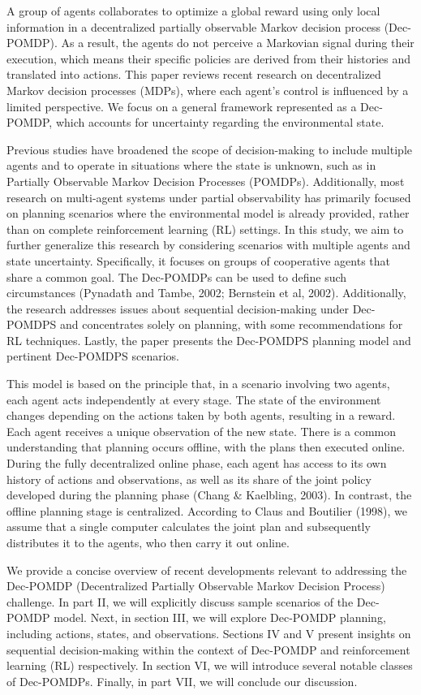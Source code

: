 A group of agents collaborates to optimize a global reward using only local information in a decentralized partially observable Markov decision process (Dec-POMDP). As a result, the agents do not perceive a Markovian signal during their execution, which means their specific policies are derived from their histories and translated into actions. This paper reviews recent research on decentralized Markov decision processes (MDPs), where each agent's control is influenced by a limited perspective. We focus on a general framework represented as a Dec-POMDP, which accounts for uncertainty regarding the environmental state.


Previous studies have broadened the scope of decision-making to include multiple agents and to operate in situations where the state is unknown, such as in Partially Observable Markov Decision Processes (POMDPs). Additionally, most research on multi-agent systems under partial observability has primarily focused on planning scenarios where the environmental model is already provided, rather than on complete reinforcement learning (RL) settings. In this study, we aim to further generalize this research by considering scenarios with multiple agents and state uncertainty. Specifically, it focuses on groups of cooperative agents that share a common goal. The Dec-POMDPs can be used to define such circumstances (Pynadath and Tambe, 2002; Bernstein et al, 2002).  Additionally, the research addresses issues about sequential decision-making under Dec-POMDPS and concentrates solely on planning, with some recommendations for RL techniques. Lastly, the paper presents the Dec-POMDPS planning model and pertinent Dec-POMDPS scenarios.

This model is based on the principle that, in a scenario involving two agents, each agent acts independently at every stage. The state of the environment changes depending on the actions taken by both agents, resulting in a reward. Each agent receives a unique observation of the new state. There is a common understanding that planning occurs offline, with the plans then executed online. During the fully decentralized online phase, each agent has access to its own history of actions and observations, as well as its share of the joint policy developed during the planning phase (Chang & Kaelbling, 2003). In contrast, the offline planning stage is centralized. According to Claus and Boutilier (1998), we assume that a single computer calculates the joint plan and subsequently distributes it to the agents, who then carry it out online.

We provide a concise overview of recent developments relevant to addressing the Dec-POMDP (Decentralized Partially Observable Markov Decision Process) challenge. In part II, we will explicitly discuss sample scenarios of the Dec-POMDP model. Next, in section III, we will explore Dec-POMDP planning, including actions, states, and observations. Sections IV and V present insights on sequential decision-making within the context of Dec-POMDP and reinforcement learning (RL) respectively. In section VI, we will introduce several notable classes of Dec-POMDPs. Finally, in part VII, we will conclude our discussion.



